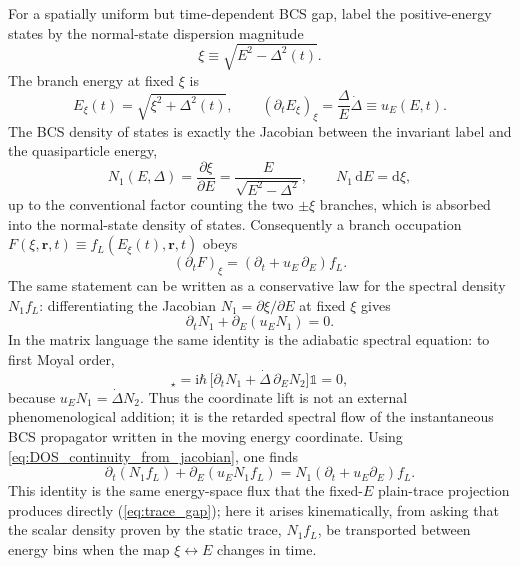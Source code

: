 \documentclass[
  aps,
  prb,
  preprint,
  superscriptaddress,
  longbibliography,
  nofootinbib
]{revtex4-2}
\newcommand{\dd}{\mathrm{d}}
\newcommand{\ii}{\mathrm{i}}
\newcommand{\br}{\mathbf{r}}
\newcommand{\DOS}{N_1}
\newcommand{\fL}{f_L}
\newcommand{\hatg}{\hat{g}}
\providecommand{\openone}{}\renewcommand{\openone}{\mathds{1}}
\begin{document}
For a spatially uniform but time-dependent BCS gap, label the positive-energy
states by the normal-state dispersion magnitude
\begin{equation}
  \xi \equiv \sqrt{E^2-\Delta^2(t)} .
  \label{eq:xi_label}
\end{equation}
The branch energy at fixed \(\xi\) is
\begin{equation}
  E_\xi(t)=\sqrt{\xi^2+\Delta^2(t)},
  \qquad
  \left(\partial_t E_\xi\right)_\xi
  =
  \frac{\Delta}{E}\dot\Delta
  \equiv u_E(E,t).
  \label{eq:moving_energy_velocity}
\end{equation}
The BCS density of states is exactly the Jacobian between the invariant label
and the quasiparticle energy,
\begin{equation}
  \DOS(E,\Delta)=\frac{\partial\xi}{\partial E}
  =\frac{E}{\sqrt{E^2-\Delta^2}},
  \qquad
  \DOS\,\dd E=\dd\xi ,
  \label{eq:DOS_jacobian}
\end{equation}
up to the conventional factor counting the two \(\pm\xi\) branches, which is
absorbed into the normal-state density of states. Consequently a branch
occupation \(F(\xi,\br,t)\equiv\fL(E_\xi(t),\br,t)\) obeys
\begin{equation}
  \left(\partial_t F\right)_\xi
  =
  \left(\partial_t+u_E\,\partial_E\right)\fL .
  \label{eq:xi_time_derivative}
\end{equation}
The same statement can be written as a conservative law for the spectral
density \(\DOS\fL\): differentiating the Jacobian
\(\DOS=\partial\xi/\partial E\) at fixed \(\xi\) gives
\begin{equation}
  \partial_t\DOS+\partial_E(u_E\DOS)=0.
  \label{eq:DOS_continuity_from_jacobian}
\end{equation}
In the matrix language the
same identity is the adiabatic spectral equation: to first Moyal order,
\begin{equation}
  [\,\hat L_0,\hatg^R\,]_\star
  =
  \ii\hbar\,
  \bigl[\partial_t\DOS+\dot\Delta\,\partial_E N_2\bigr]\openone
  =
  0,
  \label{eq:gR_star_DOS_continuity}
\end{equation}
because \(u_E\DOS=\dot\Delta N_2\). Thus the coordinate lift is not an
external phenomenological addition; it is the retarded spectral flow of the
instantaneous BCS propagator written in the moving energy coordinate. Using
\cref{eq:DOS_continuity_from_jacobian}, one finds
\begin{equation}
  \partial_t(\DOS\fL)
  +\partial_E(u_E\DOS\fL)
  =
  \DOS\left(\partial_t+u_E\partial_E\right)\fL .
  \label{eq:coordinate_lift_identity}
\end{equation}
This identity is the same energy-space flux that the fixed-\(E\)
plain-trace projection produces directly (\cref{eq:trace_gap}); here it
arises kinematically, from asking
that the scalar density proven by the static trace, \(\DOS\fL\), be transported
between energy bins when the map \(\xi\leftrightarrow E\) changes in time.
\end{document}
